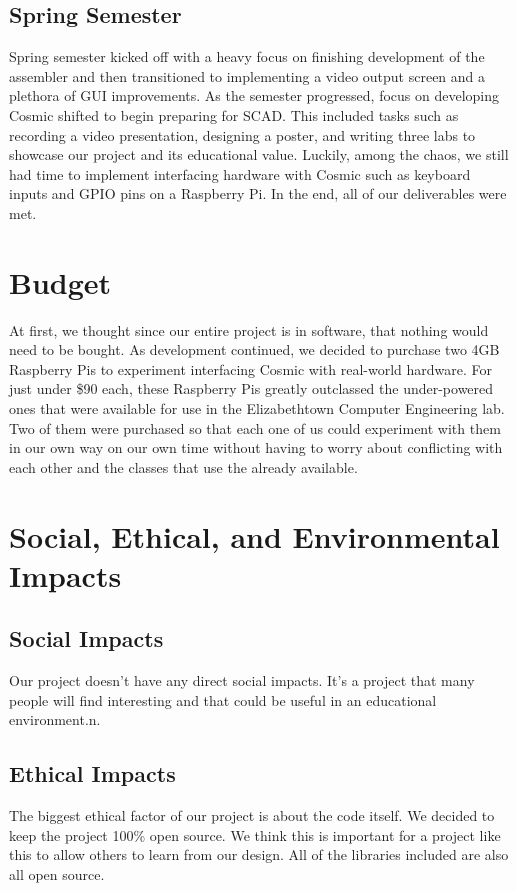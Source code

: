 \documentclass[conference]{IEEEtran}
\begin{document}
\subsection{Spring Semester}
Spring semester kicked off with a heavy focus on finishing development of the assembler and then transitioned to implementing a video output screen and a plethora of GUI improvements. As the semester progressed, focus on developing Cosmic shifted to begin preparing for SCAD. This included tasks such as recording a video presentation, designing a poster, and writing three labs to showcase our project and its educational value. Luckily, among the chaos, we still had time to implement interfacing hardware with Cosmic such as keyboard inputs and GPIO pins on a Raspberry Pi. In the end, all of our deliverables were met.


\section{Budget}
At first, we thought since our entire project is in software, that nothing would need to be bought. As development continued, we decided to purchase two 4GB Raspberry Pis to experiment interfacing Cosmic with real-world hardware. For just under \$90 each, these Raspberry Pis greatly outclassed the under-powered ones that were available for use in the Elizabethtown Computer Engineering lab. Two of them were purchased so that each one of us could experiment with them in our own way on our own time without having to worry about conflicting with each other and the classes that use the already available.


\section{Social, Ethical, and Environmental Impacts}

\subsection{Social Impacts}
Our project doesn't have any direct social impacts. It's a project that many people will find interesting and that could be useful in an educational environment.n.

\subsection{Ethical Impacts}
The biggest ethical factor of our project is about the code itself. We decided to keep the project 100\% open source. We think this is important for a project like this to allow others to learn from our design. All of the libraries included are also all open source.
\end{document}
